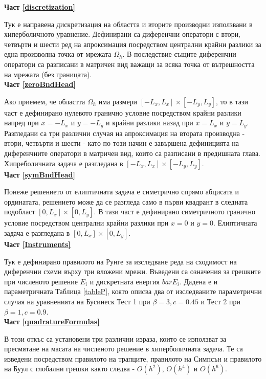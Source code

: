 \documentclass[a4paper]{article}
\theoremstyle{remark}
\begin{document}
\textbf{Част \ref{discretization}}

Тук е направена дискретизация на областта и вторите производни използвани в хиперболичното уравнение. Дефинирани са диференчни оператори с втори, четвърти и шести ред на апроксимация посредством централни крайни разлики за една произволна точка от мрежата $\Omega_h$. В последствие същите диференчни оператори са разписани в матричен вид важащи за всяка точка от вътрешността на мрежата (без границата). \\

\textbf{Част \ref{zeroBndHead}}

Ако приемем, че областта $\Omega_h$ има размери $[-L_x, L_x]\times[-L_y, L_y]$, то в тази част е дефинирано нулевото гранично условие посредством крайни разлики напред при $x=-L_x$ и $y=-L_y$ и крайни разлики назад при $x=L_x$ и $y=L_y$. Разгледани са три различни случая на апроксимация на втората производна - втори, четвърти и шести - като по този начин е завършена дефиницията на диференчните оператори в матричен вид, които са разписани в предишната глава. Хипреболичната задача е разгледана в $[-L_x, L_x]\times[-L_y, L_y]$. \\

\textbf{Част \ref{symBndHead}}

Понеже решението от елиптичната задача е симетрично спрямо абцисата и ординатата, решението може да се разгледа само в първи квадрант в следната подобласт $[0, L_x]\times[0, L_y]$. В тази част е дефинирано симетричното гранично условие посредством централни крайни разлики при $x=0$ и $y=0$. Елиптичната задача е разгледана в $[0, L_x]\times[0, L_y]$. \\


\textbf{Част \ref{Instruments}} 

Тук е дефинирано правилото на Рунге за изследване реда на сходимост на диференчни схеми върху три вложени мрежи. Въведени са означения за грешките при численото решение $\bar{ E_i}$ и дискретната енергия $bar{\bar{ E_i}}$. Дадена е и параметричната Таблица \ref{tableP}, която описва два от изследваните параметрични случая на уравненията на Бусинеск Тест 1 при $\beta = 3, c=0.45$ и Тест 2 при $\beta = 1, c=0.9$. \\

\textbf{Част \ref{quadratureFormulas}} 

В този откъс са установени три различни израза, които се използват за пресмятане на масата на численото решение в хиперболичната задача. Те са изведени посредством правилото на трапците, правилото на  Симпсън и правилото на Буул с глобални грешки както следва - $O(h^2)$, $O(h^4)$ и $O(h^6)$.
\end{document}
